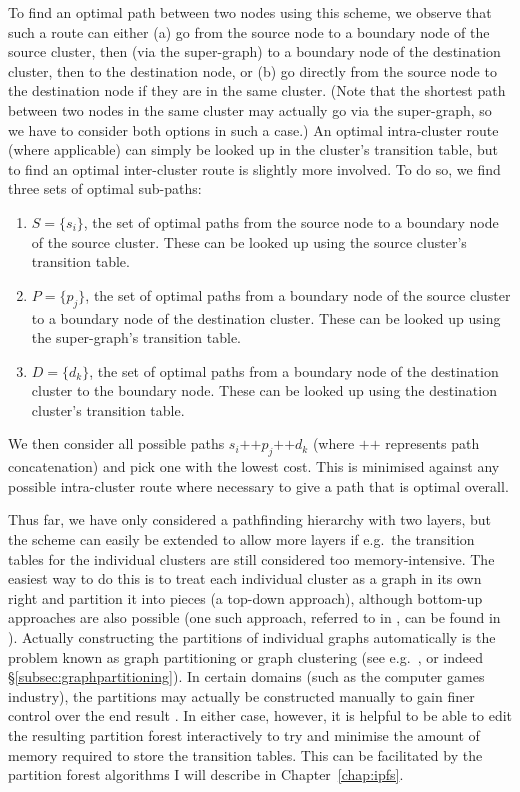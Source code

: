 To find an optimal path between two nodes using this scheme, we observe that such a route can either (a) go from the source node to a boundary node of the source cluster, then (via the super-graph) to a boundary node of the destination cluster, then to the destination node, or (b) go directly from the source node to the destination node if they are in the same cluster. (Note that the shortest path between two nodes in the same cluster may actually go via the super-graph, so we have to consider both options in such a case.) An optimal intra-cluster route (where applicable) can simply be looked up in the cluster's transition table, but to find an optimal inter-cluster route is slightly more involved. To do so, we find three sets of optimal sub-paths:
%
\begin{enumerate}

\item $S = \{s_i\}$, the set of optimal paths from the source node to a boundary node of the source cluster. These can be looked up using the source cluster's transition table.
\item $P = \{p_j\}$, the set of optimal paths from a boundary node of the source cluster to a boundary node of the destination cluster. These can be looked up using the super-graph's transition table.
\item $D = \{d_k\}$, the set of optimal paths from a boundary node of the destination cluster to the boundary node. These can be looked up using the destination cluster's transition table.

\end{enumerate}
%
We then consider all possible paths $s_i \mbox{++} p_j \mbox{++} d_k$ (where $\mbox{++}$ represents path concatenation) and pick one with the lowest cost. This is minimised against any possible intra-cluster route where necessary to give a path that is optimal overall.

Thus far, we have only considered a pathfinding hierarchy with two layers, but the scheme can easily be extended to allow more layers if e.g.~the transition tables for the individual clusters are still considered too memory-intensive. The easiest way to do this is to treat each individual cluster as a graph in its own right and partition it into pieces (a top-down approach), although bottom-up approaches are also possible (one such approach, referred to in \cite{kim98}, can be found in \cite{jing96}). Actually constructing the partitions of individual graphs automatically is the problem known as graph partitioning or graph clustering (see e.g.~\cite{huang96,jing98}, or indeed \S\ref{subsec:graphpartitioning}). In certain domains (such as the computer games industry), the partitions may actually be constructed manually to gain finer control over the end result \cite{dickheiser04}. In either case, however, it is helpful to be able to edit the resulting partition forest interactively to try and minimise the amount of memory required to store the transition tables. This can be facilitated by the partition forest algorithms I will describe in Chapter~\ref{chap:ipfs}.

